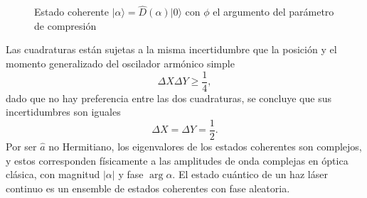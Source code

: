 \begin{figure}[!h]
\begin{tikzpicture}[x=0.75pt,y=0.75pt,yscale=-1,xscale=1]
  \end{tikzpicture}

  \caption{Estado coherente $\vert \alpha \rangle = \hat{D}(\alpha)\vert 0 \rangle$ con $\phi$ el argumento del parámetro de compresión}
  \label{fig:displaced-vacuum}
\end{figure}

Las cuadraturas están sujetas a la misma incertidumbre que la posición y el momento generalizado del oscilador armónico simple
\begin{equation*}
  \Delta X \Delta Y \geq \frac{1}{4},
\end{equation*}
dado que no hay preferencia entre las dos cuadraturas, se concluye que sus incertidumbres son iguales
\begin{equation*}
  \Delta X = \Delta Y = \frac{1}{2}.
\end{equation*}
Por ser $\hat{a}$ no Hermitiano, los eigenvalores de los estados coherentes son complejos, y estos corresponden físicamente a las amplitudes de onda complejas en óptica clásica, con magnitud $|\alpha|$ y fase $\arg \alpha$. El estado cuántico de un haz láser continuo es un ensemble de estados coherentes con fase aleatoria.


